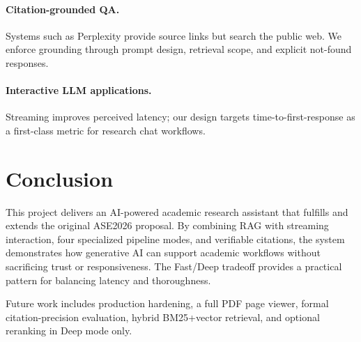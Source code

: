 \documentclass[sigplan,review,anonymous]{acmart}
\begin{document}
\paragraph{Citation-grounded QA.}
Systems such as Perplexity provide source links but search the public web.
We enforce grounding through prompt design, retrieval scope, and explicit not-found responses.

\paragraph{Interactive LLM applications.}
Streaming improves perceived latency; our design targets time-to-first-response as a
first-class metric for research chat workflows.

\section{Conclusion}
\label{sec:conclusion}

This project delivers an AI-powered academic research assistant that fulfills and extends
the original ASE2026 proposal.
By combining RAG with streaming interaction, four specialized pipeline modes, and verifiable
citations, the system demonstrates how generative AI can support academic workflows without
sacrificing trust or responsiveness.
The Fast/Deep tradeoff provides a practical pattern for balancing latency and thoroughness.

Future work includes production hardening, a full PDF page viewer, formal citation-precision
evaluation, hybrid BM25+vector retrieval, and optional reranking in Deep mode only.



\end{document}
